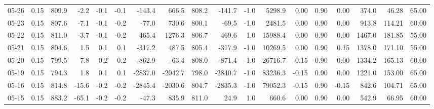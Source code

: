 \begin{threeparttable}
{\begin{tabular}{lrrrrrrrrrrrrrrrrr}
  05-26 &     0.15 & 809.9 &              -2.2 &              -0.1 &               -0.1 &             -143.4 &   666.5 & 808.2 &     -141.7 &                     -1.0 &              5298.9 &       0.00 &      0.90 &           0.00 &            374.0 &           46.28 &                  65.00 \\
  05-23 &     0.15 & 807.6 &              -7.1 &              -0.1 &               -0.2 &              -77.0 &   730.6 & 800.1 &      -69.5 &                     -1.0 &              2481.5 &       0.00 &      0.90 &           0.00 &            913.8 &          114.21 &                  60.00 \\
  05-22 &     0.15 & 811.0 &              -3.7 &              -0.1 &               -0.2 &              465.4 &  1276.3 & 806.7 &      469.6 &                      1.0 &             15988.4 &       0.00 &      0.90 &           0.00 &           1467.0 &          181.85 &                  55.00 \\
  05-21 &     0.15 & 804.6 &               1.5 &               0.1 &                0.1 &             -317.2 &   487.5 & 805.4 &     -317.9 &                     -1.0 &             10269.5 &       0.00 &      0.90 &           0.15 &           1378.0 &          171.10 &                  55.00 \\
  05-20 &     0.15 & 799.5 &               7.8 &               0.2 &                0.2 &             -862.9 &   -63.4 & 808.0 &     -871.4 &                     -1.0 &             26716.7 &      -0.15 &      0.90 &           0.00 &           1334.2 &          165.13 &                  60.00 \\
  05-19 &     0.15 & 794.3 &               1.8 &               0.1 &                0.1 &            -2837.0 & -2042.7 & 798.0 &    -2840.7 &                     -1.0 &             83236.3 &      -0.15 &      0.90 &           0.00 &           1221.0 &          153.00 &                  65.00 \\
  05-16 &     0.15 & 814.8 &             -15.6 &              -0.2 &               -0.2 &            -2845.4 & -2030.6 & 804.7 &    -2835.3 &                     -1.0 &             79052.3 &      -0.15 &      0.90 &          -0.15 &            842.6 &          104.71 &                  65.00 \\
  05-15 &     0.15 & 883.2 &             -65.1 &              -0.2 &               -0.2 &              -47.3 &   835.9 & 811.0 &       24.9 &                      1.0 &               660.6 &       0.00 &      0.90 &           0.00 &            542.9 &           66.95 &                  60.00 \\

\end{tabular}}
\end{threeparttable}
